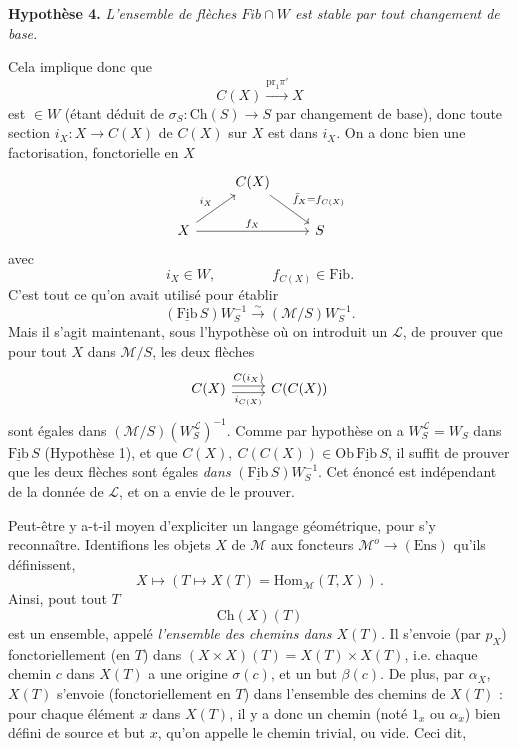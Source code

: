 \documentclass[11pt]{article}
\newcommand{\printedpage}[1]{\marginpar{\footnotesize p.~#1}}
\newcommand{\msp}[1]{\marginpar{\footnotesize [#1]}}
\newcommand{\Fib}{\underline{\mathrm{Fib}}}
\newcommand{\Ch}{\mathrm{Ch}}
\newcommand{\pr}{\mathrm{pr}}
\begin{document}
\textbf{Hypothèse 4.} \textit{L'ensemble de flèches $\mathit{Fib}\cap W$ est stable par tout changement de base.}


\printedpage{65}

\msp{page 103}
Cela implique donc que
\[
C(X)\xrightarrow{\pr_1\pi'}X
\]
 est $\in W$ (étant déduit de $\sigma_S : \Ch(S)\longrightarrow S$ par changement de base), donc toute section $i_X : X\longrightarrow C(X)$ de $C(X)$ sur $X$ est dans $i_X$. On a donc bien une factorisation, fonctorielle en $X$
\[
\begin{tikzcd}
 & C(X) \arrow[dr, "\bar f_X=f_{C(X)}"] & \\
X \arrow[ur, "i_X"] \arrow[rr, "f_X"] & & S
\end{tikzcd}
\]
avec
\[
i_X\in W,\qquad\qquad f_{C(X)}\in\mathrm{Fib}.
\]
C'est tout ce qu'on avait utilisé pour établir
\[
(\Fib\,S)W_S^{-1}\xrightarrow{\sim}(\mathcal{M}/S)W_S^{-1}.
\]
Mais il s'agit maintenant, sous l'hypothèse où on introduit un $\mathcal{L}$, de prouver que pour tout $X$ dans $\mathcal{M}/S$, les deux flèches
\[
\begin{tikzcd}
C(X) \arrow[r, shift left, "C(i_X)"] \arrow[r, shift right, "i_{C(X)}"'] & C(C(X))
\end{tikzcd}
\]
sont égales dans $(\mathcal{M}/S)(W_S^{\mathcal{L}})^{-1}$. Comme par hypothèse on a $W_S^{\mathcal{L}}=W_S$ dans $\Fib\,S$ (Hypothèse 1), et que $C(X),\ C(C(X))\in\mathrm{Ob}\,\Fib\,S$,
\msp{page 104}
il suffit de prouver que les deux flèches sont égales \textit{dans} $(\Fib\,S)W_S^{-1}$. Cet énoncé est indépendant de la donnée de $\mathcal{L}$, et on a envie de le prouver.

Peut-être y a-t-il moyen d'expliciter un langage géométrique, pour s'y reconnaître. Identifions les objets $X$ de $\mathcal{M}$ aux foncteurs $\mathcal{M}^o\longrightarrow(\mathrm{Ens})$ qu'ils définissent,
\[
X\longmapsto(T\longmapsto X(T)=\mathrm{Hom}_{\mathcal{M}}(T,X))\,.
\]
Ainsi, pout tout $T$ %
\[
\Ch(X)(T)
\]
est un ensemble, appelé \textit{l'ensemble des chemins dans $X(T)$.} Il s'envoie (par $p_X$) fonctoriellement (en $T$) dans $(X\times X)(T)=X(T)\times X(T)$, i.e. chaque chemin $c$ dans $X(T)$ a une origine $\sigma(c)$, et un but $\beta(c)$. De plus, par $\alpha_X$, $X(T)$ s'envoie (fonctoriellement en $T$) dans l'ensemble des chemins de $X(T)$ : pour chaque élément $x$ dans $X(T)$, il y a donc un chemin (noté $1_x$ ou $\alpha_x$) bien défini de source et but $x$, qu'on appelle le chemin trivial, ou vide. Ceci dit,
\end{document}
